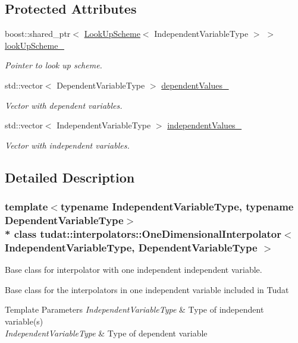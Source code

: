 \subsection*{Protected Attributes}
\begin{DoxyCompactItemize}
\item 
boost\+::shared\+\_\+ptr$<$ \hyperlink{classtudat_1_1interpolators_1_1LookUpScheme}{Look\+Up\+Scheme}$<$ Independent\+Variable\+Type $>$ $>$ \hyperlink{classtudat_1_1interpolators_1_1OneDimensionalInterpolator_a2a10fe6e43ac42100e4f650ab83798f5}{look\+Up\+Scheme\+\_\+}
\begin{DoxyCompactList}\small\item\em Pointer to look up scheme. \end{DoxyCompactList}\item 
std\+::vector$<$ Dependent\+Variable\+Type $>$ \hyperlink{classtudat_1_1interpolators_1_1OneDimensionalInterpolator_aabbc1fda1543131d0e6bf62bcd377839}{dependent\+Values\+\_\+}
\begin{DoxyCompactList}\small\item\em Vector with dependent variables. \end{DoxyCompactList}\item 
std\+::vector$<$ Independent\+Variable\+Type $>$ \hyperlink{classtudat_1_1interpolators_1_1OneDimensionalInterpolator_a283eacac87aef562273161b6d42c77f6}{independent\+Values\+\_\+}
\begin{DoxyCompactList}\small\item\em Vector with independent variables. \end{DoxyCompactList}\end{DoxyCompactItemize}


\subsection{Detailed Description}
\subsubsection*{template$<$typename Independent\+Variable\+Type, typename Dependent\+Variable\+Type$>$\\*
class tudat\+::interpolators\+::\+One\+Dimensional\+Interpolator$<$ Independent\+Variable\+Type, Dependent\+Variable\+Type $>$}

Base class for interpolator with one independent independent variable. 

Base class for the interpolators in one independent variable included in Tudat 
\begin{DoxyTemplParams}{Template Parameters}
{\em Independent\+Variable\+Type} & Type of independent variable(s) \\
\hline
{\em Independent\+Variable\+Type} & Type of dependent variable \\
\hline
\end{DoxyTemplParams}


